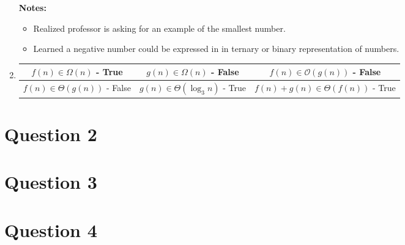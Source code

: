 \documentclass[12pt]{article}
\begin{document}
\begin{enumerate}
    \bigskip

    \textbf{Notes:}

    \begin{itemize}
        \item Realized professor is asking for an example of the smallest number.
        \item Learned a negative number could be expressed in in ternary or binary
        representation of numbers.
    \end{itemize}

    \item

    \begin{tabular}{c|c|c}
        \hline
        $f(n) \in \Omega(n)$ - True & $g(n) \in \Omega(n)$ - False & $f(n) \in \mathcal{O}(g(n))$ - False\\
        \hline
        $f(n) \in \Theta(g(n))$ - False & $g(n) \in \Theta(\log_3 n)$ - True & $f(n) + g(n) \in \Theta(f(n))$ - True\\
        \hline
    \end{tabular}
\end{enumerate}

\section*{Question 2}

\section*{Question 3}

\section*{Question 4}
\end{document}
